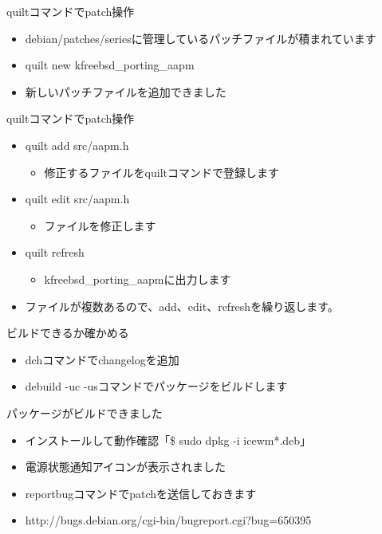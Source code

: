 \begin{frame}{quiltコマンドでpatch操作}
 \begin{itemize}
  \item debian/patches/seriesに管理しているパッチファイルが積まれています
  \item quilt new kfreebsd\_porting\_aapm
  \item 新しいパッチファイルを追加できました
 \end{itemize}
\end{frame}

\begin{frame}{quiltコマンドでpatch操作}
 \begin{itemize}
  \item quilt add src/aapm.h
  \begin{itemize}
   \item 修正するファイルをquiltコマンドで登録します
  \end{itemize}
  \item quilt edit src/aapm.h
  \begin{itemize}
   \item ファイルを修正します
  \end{itemize}
  \item quilt refresh
  \begin{itemize}
   \item kfreebsd\_porting\_aapmに出力します
  \end{itemize}
  \item ファイルが複数あるので、add、edit、refreshを繰り返します。
 \end{itemize}
\end{frame}

\begin{frame}{ビルドできるか確かめる}
 \begin{itemize}
  \item dchコマンドでchangelogを追加
  \item debuild -uc -usコマンドでパッケージをビルドします
 \end{itemize}
\end{frame}

\begin{frame}{パッケージがビルドできました}
 \begin{itemize}
  \item インストールして動作確認「\$ sudo dpkg -i icewm*.deb」 
  \item 電源状態通知アイコンが表示されました
  \item reportbugコマンドでpatchを送信しておきます
  \item http://bugs.debian.org/cgi-bin/bugreport.cgi?bug=650395
 \end{itemize}
\end{frame}

